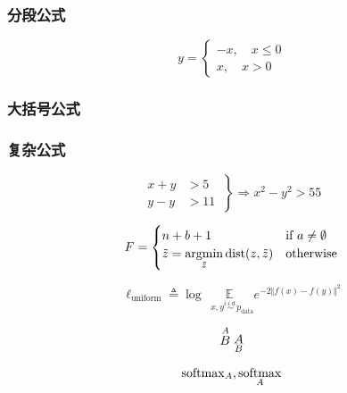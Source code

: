 \subsubsection{分段公式}
\begin{equation}
    y= \begin{cases}
    -x,\quad x\leq 0 \\
    x,\quad x>0
    \end{cases} 
\end{equation}

\subsubsection{大括号公式}



\subsubsection{复杂公式}
\begin{equation}
\left.
\begin{aligned}
x+y &> 5 \\
y-y &> 11
\end{aligned}
\ \right\}\Rightarrow x^2 - y^2 > 55
\end{equation}

\begin{equation}
  F = 
  \begin{cases}
    n + b + 1 & \text{if $a \neq \emptyset$}\\

    \tilde{z} = \operatornamewithlimits{argmin}\limits_{\tilde{z}}\operatorname{dist}(z, \tilde{z}) & \text{otherwise}
  \end{cases}
\end{equation}

\begin{equation}
    \ell_{\mathrm{uniform}}\triangleq\log \underset{~~~x, y\stackrel{i.i.d.}{\sim} p_{\mathrm{data}}}{\mathbb{E}}   e^{-2\Vert f(x)-f(y) \Vert^2}
\end{equation}

\begin{equation}
    \stackrel{A}{B} \\ 
    \underset{B}{A}
\end{equation}

\begin{align}
    \operatorname{softmax}_A, \operatornamewithlimits{softmax}_A
\end{align}


